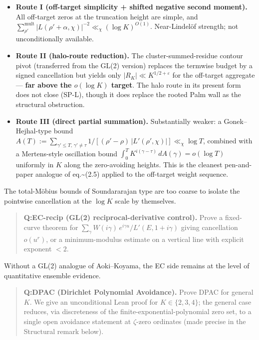 \begin{itemize}
\item
  \textbf{Route I (off-target simplicity + shifted negative second
  moment).} All off-target zeros at the truncation height are
  simple, and
  \(\sum_{\rho'}^\mathrm{mult} |L(\rho' + \alpha,\chi)|^{-2} \ll_\chi (\log K)^{O(1)}\).
  Near-Lindelöf strength; not unconditionally available.
\item
  \textbf{Route II (halo-route reduction).} The cluster-summed-residue
  contour pivot (transferred from the GL(2) version) replaces the
  termwise budget by a signed cancellation but yields only
  \(|R_K| \ll K^{1/2 + \varepsilon}\) for the off-target aggregate ---
  \textbf{far above the \(o(\log K)\) target}. The halo route in its
  present form does not close (SP-L), though it does replace the
  rooted Palm wall as the structural obstruction.
\item
  \textbf{Route III (direct partial summation).} Substantially weaker:
  a Gonek--Hejhal-type bound
  \(A(T) := \sum_{\gamma' \le T,\, \gamma' \ne \tau}
  1/[(\rho' - \rho)\,|L'(\rho', \chi)|] \ll_\chi \log T\), combined
  with a Mertens-style oscillation bound
  \(\int_0^T K^{i(\gamma - \tau)}\, dA(\gamma) = o(\log T)\) uniformly
  in \(K\) along the zero-avoiding heights. This is the cleanest
  pen-and-paper analogue of \cite{Akatsuka2017EulerProduct} eq.\textasciitilde(2.5) applied to the
  off-target weight sequence.
\end{itemize}

The total-Möbius bounds of Soundararajan type are too coarse to
isolate the pointwise cancellation at the \(\log K\) scale by
themselves.

\begin{quote}
\textbf{Q:EC-recip (GL(2) reciprocal-derivative control).} Prove a
fixed-curve theorem for
\(\sum_\gamma \widehat W(i\gamma)\,e^{i\gamma u} / L'(E, 1 + i\gamma)\)
giving cancellation \(o(u^r)\), or a minimum-modulus estimate
on a vertical line with explicit exponent \(< 2\).
\end{quote}

Without a GL(2) analogue of Aoki--Koyama, the EC side remains at the
level of quantitative ensemble evidence.

\begin{quote}
\textbf{Q:DPAC (Dirichlet Polynomial Avoidance).} Prove DPAC for
general \(K\). We give an unconditional Lean proof for
\(K \in \{2, 3, 4\}\); the general case reduces, via \cite{Polya1913}
discreteness of the finite-exponential-polynomial zero set, to
a single open avoidance statement at \(\zeta\)-zero ordinates
(made precise in the Structural remark below).
\end{quote}


